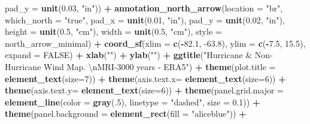 \documentclass[12pt,oneside]{reedthesis}
\newenvironment{Shaded}{\begin{snugshade}}{\end{snugshade}}
\newcommand{\CharTok}[1]{\textcolor[rgb]{0.31,0.60,0.02}{#1}}
\newcommand{\DataTypeTok}[1]{\textcolor[rgb]{0.13,0.29,0.53}{#1}}
\newcommand{\DecValTok}[1]{\textcolor[rgb]{0.00,0.00,0.81}{#1}}
\newcommand{\FloatTok}[1]{\textcolor[rgb]{0.00,0.00,0.81}{#1}}
\newcommand{\KeywordTok}[1]{\textcolor[rgb]{0.13,0.29,0.53}{\textbf{#1}}}
\newcommand{\NormalTok}[1]{#1}
\newcommand{\OperatorTok}[1]{\textcolor[rgb]{0.81,0.36,0.00}{\textbf{#1}}}
\newcommand{\OtherTok}[1]{\textcolor[rgb]{0.56,0.35,0.01}{#1}}
\newcommand{\StringTok}[1]{\textcolor[rgb]{0.31,0.60,0.02}{#1}}
\begin{document}
\begin{Shaded}
\begin{Highlighting}[]
   \DataTypeTok{pad_y =} \KeywordTok{unit}\NormalTok{(}\FloatTok{0.03}\NormalTok{, }\StringTok{"in"}\NormalTok{)) }\OperatorTok{+}\StringTok{ }
\StringTok{  }\KeywordTok{annotation_north_arrow}\NormalTok{(}\DataTypeTok{location =} \StringTok{"br"}\NormalTok{, }\DataTypeTok{which_north =} \StringTok{"true"}\NormalTok{, }\DataTypeTok{pad_x =} \KeywordTok{unit}\NormalTok{(}\FloatTok{0.01}\NormalTok{, }\StringTok{"in"}\NormalTok{), }\DataTypeTok{pad_y =} \KeywordTok{unit}\NormalTok{(}\FloatTok{0.02}\NormalTok{, }\StringTok{"in"}\NormalTok{), }\DataTypeTok{height =} \KeywordTok{unit}\NormalTok{(}\FloatTok{0.5}\NormalTok{, }\StringTok{"cm"}\NormalTok{), }
   \DataTypeTok{width =} \KeywordTok{unit}\NormalTok{(}\FloatTok{0.5}\NormalTok{, }\StringTok{"cm"}\NormalTok{), }\DataTypeTok{style =}\NormalTok{ north_arrow_minimal) }\OperatorTok{+}
\StringTok{  }\KeywordTok{coord_sf}\NormalTok{(}\DataTypeTok{xlim =} \KeywordTok{c}\NormalTok{(}\OperatorTok{-}\FloatTok{82.1}\NormalTok{, }\FloatTok{-63.8}\NormalTok{), }\DataTypeTok{ylim =} \KeywordTok{c}\NormalTok{(}\OperatorTok{-}\FloatTok{7.5}\NormalTok{, }\FloatTok{15.5}\NormalTok{), }\DataTypeTok{expand =} \OtherTok{FALSE}\NormalTok{) }\OperatorTok{+}
\StringTok{  }\KeywordTok{xlab}\NormalTok{(}\StringTok{""}\NormalTok{) }\OperatorTok{+}\StringTok{ }
\StringTok{  }\KeywordTok{ylab}\NormalTok{(}\StringTok{""}\NormalTok{) }\OperatorTok{+}\StringTok{ }
\StringTok{  }\KeywordTok{ggtitle}\NormalTok{(}\StringTok{"Hurricane & Non-Hurricane Wind Map. }\CharTok{\textbackslash{}n}\StringTok{MRI-3000 years - ERA5"}\NormalTok{) }\OperatorTok{+}\StringTok{ }
\StringTok{  }\KeywordTok{theme}\NormalTok{(}\DataTypeTok{plot.title =} \KeywordTok{element_text}\NormalTok{(}\DataTypeTok{size=}\DecValTok{7}\NormalTok{)) }\OperatorTok{+}
\StringTok{  }\KeywordTok{theme}\NormalTok{(}\DataTypeTok{axis.text.x=} \KeywordTok{element_text}\NormalTok{(}\DataTypeTok{size=}\DecValTok{6}\NormalTok{)) }\OperatorTok{+}\StringTok{ }
\StringTok{  }\KeywordTok{theme}\NormalTok{(}\DataTypeTok{axis.text.y=} \KeywordTok{element_text}\NormalTok{(}\DataTypeTok{size=}\DecValTok{6}\NormalTok{)) }\OperatorTok{+}
\StringTok{  }\KeywordTok{theme}\NormalTok{(}\DataTypeTok{panel.grid.major =} \KeywordTok{element_line}\NormalTok{(}\DataTypeTok{color =} \KeywordTok{gray}\NormalTok{(.}\DecValTok{5}\NormalTok{), }\DataTypeTok{linetype =} \StringTok{"dashed"}\NormalTok{, }\DataTypeTok{size =} \FloatTok{0.1}\NormalTok{)) }\OperatorTok{+}
\StringTok{  }\KeywordTok{theme}\NormalTok{(}\DataTypeTok{panel.background =} \KeywordTok{element_rect}\NormalTok{(}\DataTypeTok{fill =} \StringTok{"aliceblue"}\NormalTok{)) }\OperatorTok{+}

\end{Highlighting}
\end{Shaded}
\end{document}
